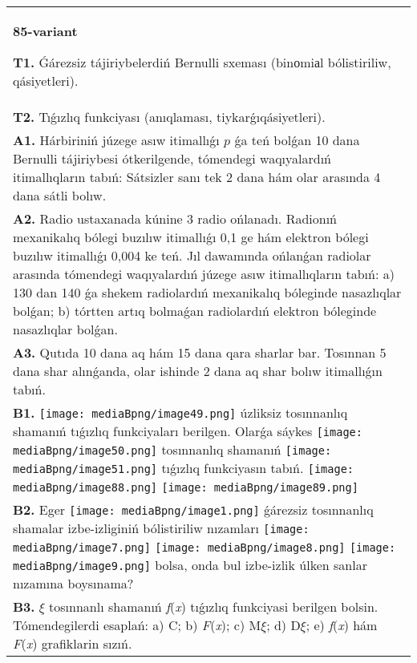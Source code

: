 \documentclass{article}
\begin{document}
\vspace{1cm}


\begin{tabular}{m{17cm}}
\textbf{85-variant}
\newline

\textbf{T1.} Ǵárezsiz tájiriybelerdiń Bernulli sxeması (binоmiаl bólistiriliw, qásiyetleri).
 \\
\textbf{T2.} Tıǵızlıq funkciyası (anıqlaması, tiykarǵıqásiyetleri).
 \\
\textbf{A1.} Hárbiriniń júzege asıw itimallıǵı $p$ ǵa teń bolǵan 10 dana Bernulli tájiriybesi ótkerilgende, tómendegi waqıyalardıń itimallıqların tabıń: Sátsizler sanı tek 2 dana hám olar arasında 4 dana sátli bolıw.
 \\
\textbf{A2.} Radio ustaxanada kúnine 3 radio ońlanadı. Radionıń mexanikalıq bólegi buzılıw itimallıǵı 0,1 ge hám elektron bólegi buzılıw itimallıǵı 0,004 ke teń. Jıl dawamında ońlanǵan radiolar arasında tómendegi waqıyalardıń júzege asıw itimallıqların tabıń: a) 130 dan 140 ǵa shekem radiolardıń mexanikalıq bóleginde nasazlıqlar bolǵan; b) tórtten artıq bolmaǵan radiolardıń elektron bóleginde nasazlıqlar bolǵan.
 \\
\textbf{A3.} Qutıda 10 dana aq hám 15 dana qara sharlar bar. Tosınnan 5 dana shar alınǵanda, olar ishinde 2 dana aq shar bolıw itimallıǵın tabıń.
 \\
\textbf{B1.} \texttt{[image: mediaBpng/image49.png]} úzliksiz tosınnanlıq shamanıń tıǵızlıq funkciyaları berilgen. Olarǵa sáykes \texttt{[image: mediaBpng/image50.png]} tosınnanlıq shamanıń \texttt{[image: mediaBpng/image51.png]} tıǵızlıq funkciyasın tabıń. \texttt{[image: mediaBpng/image88.png]} \texttt{[image: mediaBpng/image89.png]}
 \\
\textbf{B2.} Eger \texttt{[image: mediaBpng/image1.png]} ǵárezsiz tosınnanlıq shamalar izbe-izliginiń bólistiriliw nızamları
\texttt{[image: mediaBpng/image7.png]} \texttt{[image: mediaBpng/image8.png]} \texttt{[image: mediaBpng/image9.png]}
bolsa, onda bul izbe-izlik úlken sanlar nızamına boysınama?
 \\
\textbf{B3.} $\xi$ tosınnanlı shamanıń \emph{f}(\emph{x}) tıǵızlıq funkciyasi berilgen bolsin. Tómendegilerdi esaplań: a) C; b) \emph{F}(\emph{x}); c) M$\xi$; d) D$\xi$; e) \emph{f}(\emph{x}) hám \emph{F}(\emph{x}) grafiklarin sızıń.\(f(x) = \left\{ \begin{matrix}

\end{matrix}
\end{tabular}
\end{document}
